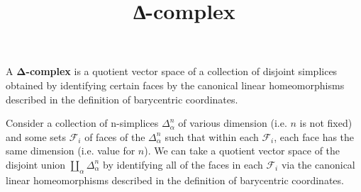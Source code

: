 \documentclass[
]{article}
\title{∆-complex}
\author{}
\date{}
\begin{document}
\maketitle

A \textbf{Δ-complex} is a quotient vector space of a collection of
disjoint simplices obtained by identifying certain faces by the
canonical linear homeomorphisms described in the definition of
barycentric coordinates.

Consider a collection of n-simplices {\(\Delta_{\alpha}^{n}\)} of
various dimension (i.e. {\(n\)} is not fixed) and some sets
{\(\mathcal{F}_{i}\)} of faces of the {\(\Delta_{\alpha}^{n}\)} such
that within each {\(\mathcal{F}_{i}\)}, each face has the same dimension
(i.e. value for {\(n\)}). We can take a quotient vector space of the
disjoint union {\(\coprod\limits_{\alpha}\Delta_{\alpha}^{n}\)} by
identifying all of the faces in each {\(\mathcal{F}_{i}\)} via the
canonical linear homeomorphisms described in the definition of
barycentric coordinates.
\end{document}
